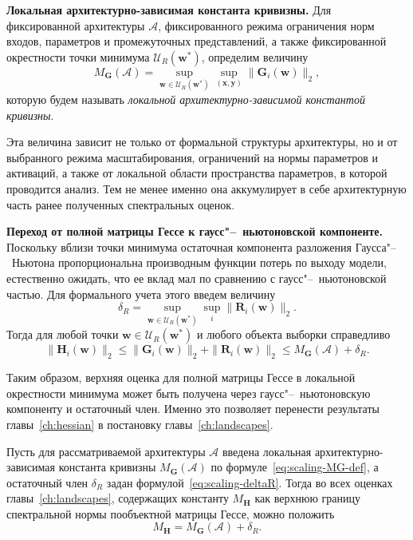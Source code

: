 \textbf{Локальная архитектурно-зависимая константа кривизны.}
Для фиксированной архитектуры $\mathcal A$, фиксированного режима ограничения норм входов, параметров и промежуточных представлений, а также фиксированной окрестности точки минимума $\mathcal U_R(\mathbf w^*)$, определим величину
\begin{equation}
    \label{eq:scaling-MG-def}
    M_{\mathbf G}(\mathcal A)
    =
    \sup_{\mathbf w \in \mathcal U_R(\mathbf w^*)}
    \sup_{(\mathbf x,\mathbf y)}
    \|\mathbf G_i(\mathbf w)\|_2,
\end{equation}
которую будем называть \emph{локальной архитектурно-зависимой константой кривизны}.

Эта величина зависит не только от формальной структуры архитектуры, но и от выбранного режима масштабирования, ограничений на нормы параметров и активаций, а также от локальной области пространства параметров, в которой проводится анализ. Тем не менее именно она аккумулирует в себе архитектурную часть ранее полученных спектральных оценок.

\textbf{Переход от полной матрицы Гессе к гаусс"--~ньютоновской компоненте.}
Поскольку вблизи точки минимума остаточная компонента разложения Гаусса"--~Ньютона пропорциональна производным функции потерь по выходу модели, естественно ожидать, что ее вклад мал по сравнению с гаусс"--~ньютоновской частью. Для формального учета этого введем величину
\begin{equation}
    \label{eq:scaling-deltaR}
    \delta_R
    =
    \sup_{\mathbf w \in \mathcal U_R(\mathbf w^*)}
    \sup_i
    \|\mathbf R_i(\mathbf w)\|_2.
\end{equation}
Тогда для любой точки $\mathbf w \in \mathcal U_R(\mathbf w^*)$ и любого объекта выборки справедливо
\begin{equation}
    \label{eq:scaling-MH-MG}
    \|\mathbf H_i(\mathbf w)\|_2
    \le
    \|\mathbf G_i(\mathbf w)\|_2 + \|\mathbf R_i(\mathbf w)\|_2
    \le
    M_{\mathbf G}(\mathcal A) + \delta_R.
\end{equation}

Таким образом, верхняя оценка для полной матрицы Гессе в локальной окрестности минимума может быть получена через гаусс"--~ньютоновскую компоненту и остаточный член. Именно это позволяет перенести результаты главы~\ref{ch:hessian} в постановку главы~\ref{ch:landscapes}.

\begin{proposition}
    \label{prop:scaling-transfer}
    Пусть для рассматриваемой архитектуры $\mathcal A$ введена локальная архитектурно-зависимая константа кривизны $M_{\mathbf G}(\mathcal A)$ по формуле~\eqref{eq:scaling-MG-def}, а остаточный член $\delta_R$ задан формулой~\eqref{eq:scaling-deltaR}. Тогда во всех оценках главы~\ref{ch:landscapes}, содержащих константу $M_{\mathbf H}$ как верхнюю границу спектральной нормы пообъектной матрицы Гессе, можно положить
    \begin{equation}
        \label{eq:scaling-transfer-MH}
        M_{\mathbf H}
        =
        M_{\mathbf G}(\mathcal A) + \delta_R.
    \end{equation}
\end{proposition}

